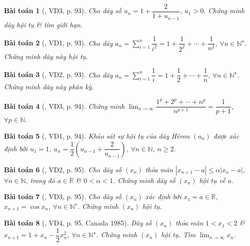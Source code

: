 \documentclass{article}
\newtheorem{baitoan}{Bài toán}
\begin{document}
\begin{baitoan}[\cite{Hung_nang_cao_phat_trien_Toan_11_tap_1}, VD3, p. 93]
	Cho dãy số $u_n = 1 + \dfrac{2}{1 + u_{n-1}}$, $u_1 > 0$. Chứng minh dãy hội tụ \& tìm giới hạn.
\end{baitoan}

\begin{baitoan}[\cite{Hung_nang_cao_phat_trien_Toan_11_tap_1}, VD1, p. 93]
	Cho dãy $a_n = \sum_{i=1}^n \dfrac{1}{i^2} = 1 + \dfrac{1}{2^2} + \cdots + \dfrac{1}{n^2}$, $\forall n\in\mathbb{N}^\star$. Chứng minh dãy này hội tụ.
\end{baitoan}

\begin{baitoan}[\cite{Hung_nang_cao_phat_trien_Toan_11_tap_1}, VD2, p. 93]
	Cho dãy $a_n = \sum_{i=1}^n \dfrac{1}{i} = 1 + \dfrac{1}{2} + \cdots + \dfrac{1}{n}$, $\forall n\in\mathbb{N}^\star$. Chứng minh dãy này phân kỳ.
\end{baitoan}

\begin{baitoan}[\cite{Hung_nang_cao_phat_trien_Toan_11_tap_1}, VD3, p. 94]
	Chứng minh $\lim_{n\to\infty} \dfrac{1^p + 2^p + \cdots + n^p}{n^{p + 1}} = \dfrac{1}{p + 1}$, $\forall p\in\mathbb{N}$.
\end{baitoan}

\begin{baitoan}[\cite{Hung_nang_cao_phat_trien_Toan_11_tap_1}, VD1, p. 94]
	Khảo sát sự hội tụ của {\rm dãy H\'eron} $(u_n)$ được xác định bởi $u_1 = 1$, $u_n = \dfrac{1}{2}\left(u_{n-1} + \dfrac{2}{u_{n-1}}\right)$, $\forall n\in\mathbb{N}$, $n\ge2$.
\end{baitoan}

\begin{baitoan}[\cite{Hung_nang_cao_phat_trien_Toan_11_tap_1}, VD2, p. 95]
	Cho dãy số $(x_n)$ thỏa mãn $|x_{n+1} - a|\le\alpha|x_n - a|$, $\forall n\in\mathbb{N}$, trong đó $a\in\mathbb{R}$ \& $0 < \alpha < 1$. Chứng minh dãy số $(x_n)$ hội tụ về $a$.
\end{baitoan}

\begin{baitoan}[\cite{Hung_nang_cao_phat_trien_Toan_11_tap_1}, VD3, p. 95]
	Cho dãy số $(x_n)$ xác định bởi $x_1 = a\in\mathbb{R}$, $x_{n+1} = \cos x_n$, $\forall n\in\mathbb{N}^\star$. Chứng minh $(x_n)$ hội tụ.
\end{baitoan}

\begin{baitoan}[\cite{Hung_nang_cao_phat_trien_Toan_11_tap_1}, VD4, p. 95, Canada 1985]
	Dãy số $(x_n)$ thỏa mãn $1 < x_1 < 2$ \& $x_{n+1} = 1 + x_n - \dfrac{1}{2}x_n^2$, $\forall n\in\mathbb{N}^\star$. Chứng minh $(x_n)$ hội tụ. Tìm $\lim_{n\to\infty} x_n$.
\end{baitoan}
\end{document}
